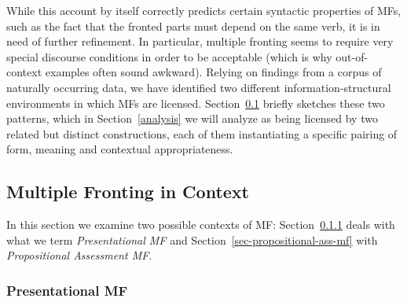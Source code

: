 While this account by itself correctly predicts certain syntactic properties of MFs, such as the fact that the fronted parts must depend on the same verb, it is in need of further refinement. In particular, multiple fronting seems to require very special discourse conditions in order to be acceptable (which is why out-of-context examples often sound awkward). %
Relying on findings from a corpus of naturally occurring data, we have identified two different information-structural environments in which MFs are licensed. Section~\ref{description} briefly sketches these two patterns, which in Section~\ref{analysis} we will analyze as being licensed by two related but distinct constructions, each of them instantiating a specific pairing of form, meaning and contextual appropriateness.


\subsection{Multiple Fronting in Context}\label{description}

In this section we examine two possible contexts of MF: Section~\ref{sec-presentational-MF} deals with what we term \emph{Presentational MF} and Section~\ref{sec-propositional-ass-mf} with \emph{Propositional Assessment MF}.

\subsubsection{Presentational MF}
\label{sec-presentational-MF}

